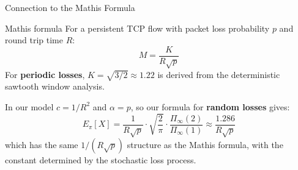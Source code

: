 \documentclass[aspectratio=169]{beamer}
\begin{document}
\begin{frame}{Connection to the Mathis Formula}

  \begin{block}{Mathis formula}
    For a persistent TCP flow with packet loss probability
    $p$ and round trip time $R$:
    \[
      M = \frac{K}{R\sqrt{p}}
    \]
    For \textbf{periodic losses}, $K = \sqrt{3/2} \approx 1.22 $ is derived
    from the deterministic sawtooth window analysis.
  \end{block}

  \bigskip
  In our model $c = 1/R^2$ and $\alpha = p$, so our formula
  for \textbf{random losses} gives:
  \[
    E_\pi[X] = \frac{1}{R\sqrt{p}}\cdot
    \sqrt{\frac{2}{\pi}}\cdot\frac{\Pi_\infty(2)}{\Pi_\infty(1)}
    \approx \frac{1.286}{R\sqrt{p}}
  \]
  which has the same $1/(R\sqrt{p})$ structure as the Mathis
  formula, with the constant determined by the stochastic
  loss process.

\end{frame}
\end{document}
